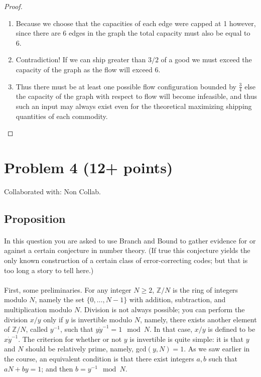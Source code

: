 \documentclass{article}
\newcommand{\ZZ}{\mathbb{Z}} %
\begin{document}
\begin{proof}
\begin{enumerate}
            \item Because we choose that the capacities of each edge were capped at 1
                  however, since there are 6 edges in the graph the total capacity must
                  also be equal to 6.
            \item Contradiction! If we can ship greater than \(3/2\) of a good we must
                  exceed the capacity of the graph as the flow will exceed 6.
            \item Thus there must be at least one possible flow configuration bounded by
                  \(\frac{3}{4}\) else the capacity of the graph with respect to flow will
                  become infeasible, and thus such an input may always exist even for the
                  theoretical maximizing shipping quantities of each commodity.
      \end{enumerate}
\end{proof}


\newpage


\section{Problem 4 (12+ points)}
Collaborated with: Non Collab.

\subsection{Proposition}
\paragraph{}
In this question you are asked to use Branch and Bound to gather evidence for or against a
certain conjecture in number theory. (If true this conjecture yields the only known
construction of a certain class of error-correcting codes; but that is too long a story to
tell here.)

\paragraph{}
First, some preliminaries. For any integer \(N \geq 2\), \(\ZZ /N\) is the ring of
integers modulo \(N\), namely the set \( \{ 0, \ldots , N-1\} \) with addition, subtraction,
and multiplication modulo \(N\). Division is not always possible; you can perform the division
\(x/y\) only if \(y\) is invertible modulo \(N\), namely, there exists another element of
\(\ZZ / N\), called \(y^{-1}\), such that \(y \dot y^{-1} = 1 \mod N\). In that case,
\(x/y\) is defined to be \(x \dot y^{-1}\). The criterion for whether or not \(y\) is
invertible is quite simple: it is that \(y\) and \(N\) should be relatively prime, namely,
gcd\((y,N) = 1\). As we saw earlier in the course, an equivalent condition is that there
exist integers \(a, b\) such that \(a N + b y = 1\); and then \(b = y^{-1} \mod N\).
\end{document}
